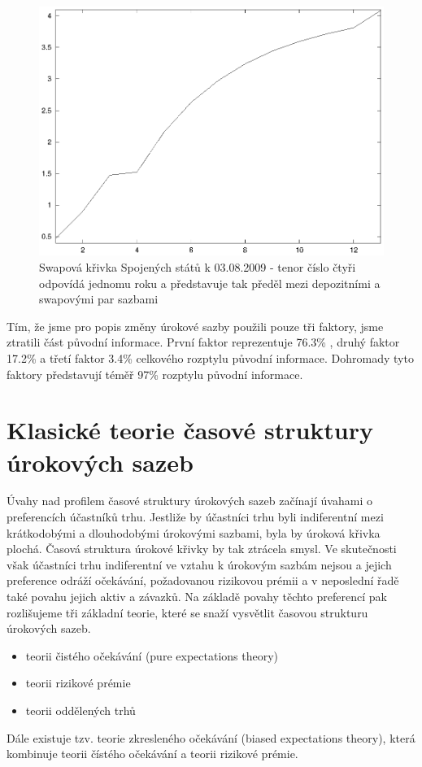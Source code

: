 \documentclass[a4paper]{book}
\begin{document}
\begin{figure}
  \centering
  \includegraphics[scale=0.75]{irs_profile.eps}
  \caption{Swapová křivka Spojených států k 03.08.2009 - tenor číslo čtyři odpovídá jednomu roku a představuje tak předěl mezi depozitními a swapovými par sazbami}
  \label{irs_profile}
\end{figure}

Tím, že jsme pro popis změny úrokové sazby použili pouze tři faktory, jsme ztratili část původní informace. První faktor reprezentuje 76.3\% , druhý faktor 17.2\% a třetí faktor 3.4\% celkového rozptylu původní informace. Dohromady tyto faktory představují téměř 97\% rozptylu původní informace.

\section{Klasické teorie časové struktury úrokových sazeb}

Úvahy nad profilem časové struktury úrokových sazeb začínají úvahami o preferencích účastníků trhu. Jestliže by účastníci trhu byli indiferentní mezi krátkodobými a dlouhodobými úrokovými sazbami, byla by úroková křivka plochá. Časová struktura úrokové křivky by tak ztrácela smysl. Ve skutečnosti však účastníci trhu indiferentní ve vztahu k úrokovým sazbám nejsou a jejich preference odráží očekávání, požadovanou rizikovou prémii a v neposlední řadě také povahu jejich aktiv a závazků. Na základě povahy těchto preferencí pak rozlišujeme tři základní teorie, které se snaží vysvětlit časovou strukturu úrokových sazeb.
\begin{itemize}
\item teorii čistého očekávání (pure expectations theory)
\item teorii rizikové prémie
\item teorii oddělených trhů
\end{itemize}
Dále existuje tzv. teorie zkresleného očekávání (biased expectations theory), která kombinuje teorii čístého očekávání a teorii rizikové prémie.
\end{document}
